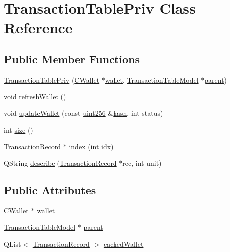 \hypertarget{class_transaction_table_priv}{}\section{Transaction\+Table\+Priv Class Reference}
\label{class_transaction_table_priv}
\subsection*{Public Member Functions}
\begin{DoxyCompactItemize}
\item 
\hyperlink{class_transaction_table_priv_a19c3442de869b47471ab3a1989a5a746}{Transaction\+Table\+Priv} (\hyperlink{class_c_wallet}{C\+Wallet} $\ast$\hyperlink{class_transaction_table_priv_a01cb7d238e5dea44b9f7f1ee75d5849d}{wallet}, \hyperlink{class_transaction_table_model}{Transaction\+Table\+Model} $\ast$\hyperlink{class_transaction_table_priv_a358d460cf7c3074fba12d03cdc5f638d}{parent})
\item 
void \hyperlink{class_transaction_table_priv_a1f81da5d7cfb2aac03a5e18e6bc91792}{refresh\+Wallet} ()
\item 
void \hyperlink{class_transaction_table_priv_a27eb6d3e1f7717dd2cad80c5ce48f404}{update\+Wallet} (const \hyperlink{classuint256}{uint256} \&\hyperlink{cache_8cc_a11ecb029164e055f28f4123ce3748862}{hash}, int status)
\item 
int \hyperlink{class_transaction_table_priv_acc5c85ae550eca3a35b7b4d68d0994bf}{size} ()
\item 
\hyperlink{class_transaction_record}{Transaction\+Record} $\ast$ \hyperlink{class_transaction_table_priv_ac692aa6aa7820e80accc971c70e0fae5}{index} (int idx)
\item 
Q\+String \hyperlink{class_transaction_table_priv_ab08d44e16bf6dd95b5b83959b3013780}{describe} (\hyperlink{class_transaction_record}{Transaction\+Record} $\ast$rec, int unit)
\end{DoxyCompactItemize}
\subsection*{Public Attributes}
\begin{DoxyCompactItemize}
\item 
\hyperlink{class_c_wallet}{C\+Wallet} $\ast$ \hyperlink{class_transaction_table_priv_a01cb7d238e5dea44b9f7f1ee75d5849d}{wallet}
\item 
\hyperlink{class_transaction_table_model}{Transaction\+Table\+Model} $\ast$ \hyperlink{class_transaction_table_priv_a358d460cf7c3074fba12d03cdc5f638d}{parent}
\item 
Q\+List$<$ \hyperlink{class_transaction_record}{Transaction\+Record} $>$ \hyperlink{class_transaction_table_priv_a410380e0d05152cf1d121f0ba0727ea8}{cached\+Wallet}
\end{DoxyCompactItemize}


